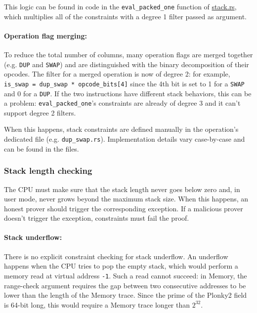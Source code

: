 This logic can be found in code in the \texttt{eval\_packed\_one} function of \href{https://github.com/0xPolygonZero/plonky2/blob/main/evm/src/cpu/stack.rs}{stack.rs},
which multiplies all of the constraints with a degree 1 filter passed as argument.

\paragraph*{Operation flag merging:}

To reduce the total number of columns, many operation flags are merged together (e.g. \texttt{DUP} and \texttt{SWAP}) and are distinguished with the binary decomposition of their opcodes.
The filter for a merged operation is now of degree 2: for example, \texttt{is\_swap = dup\_swap * opcode\_bits[4]} since the 4th bit is set to 1 for a \texttt{SWAP} and 0 for a \texttt{DUP}.
If the two instructions have different stack behaviors, this can be a problem: \texttt{eval\_packed\_one}'s constraints are already of degree 3 and it can't support degree 2 filters.

When this happens, stack constraints are defined manually in the operation's dedicated file (e.g. \texttt{dup\_swap.rs}). Implementation details vary case-by-case and can be found in the files.

\subsubsection{Stack length checking}

The CPU must make sure that the stack length never goes below zero and, in user mode, never grows beyond the maximum stack size. When this happens, an honest prover should trigger the
corresponding exception. If a malicious prover doesn't trigger the exception, constraints must fail the proof.

\paragraph*{Stack underflow:}
There is no explicit constraint checking for stack underflow. An underflow happens when the CPU tries to pop the empty stack, which would perform a memory read at virtual address \texttt{-1}.
Such a read cannot succeed: in Memory, the range-check argument requires the gap between two consecutive addresses to be lower than the length of the Memory trace. Since the prime of the Plonky2 field is 64-bit long,
this would require a Memory trace longer than $2^{32}$.

